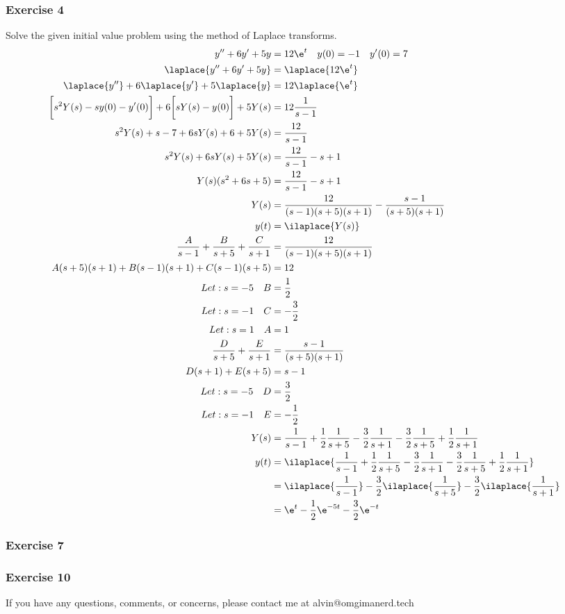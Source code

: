\documentclass{math}
\begin{document}
\subsubsection*{Exercise 4}
Solve the given initial value problem using the method of Laplace transforms.
\begin{align*}
  y''+6y'+5y &= 12\e^t \quad y(0) = -1 \quad y'(0) = 7 \\
  \laplace{y''+6y'+5y} &= \laplace{12\e^t} \\
  \laplace{y''}+6\laplace{y'}+5\laplace{y} &= 12\laplace{\e^t} \\
  \bigg[s^2Y(s)-sy(0)-y'(0)\bigg]+6\bigg[sY(s)-y(0)\bigg]+5Y(s) &=
    12\frac{1}{s-1} \\
  s^2Y(s)+s-7+6sY(s)+6+5Y(s) &= \frac{12}{s-1} \\
  s^2Y(s)+6sY(s)+5Y(s) &= \frac{12}{s-1}-s+1 \\
  Y(s)(s^2+6s+5) &= \frac{12}{s-1}-s+1 \\
  Y(s) &= \frac{12}{(s-1)(s+5)(s+1)}-\frac{s-1}{(s+5)(s+1)} \\
  y(t) &= \ilaplace{Y(s)} \\
  \frac{A}{s-1}+\frac{B}{s+5}+\frac{C}{s+1} &= \frac{12}{(s-1)(s+5)(s+1)} \\
  A(s+5)(s+1)+B(s-1)(s+1)+C(s-1)(s+5) &= 12 \\
  Let: s = -5 \quad B &= \frac{1}{2} \\
  Let: s = -1 \quad C &= -\frac{3}{2} \\
  Let: s = 1 \quad A &= 1 \\
  \frac{D}{s+5}+\frac{E}{s+1} &= \frac{s-1}{(s+5)(s+1)} \\
  D(s+1)+E(s+5) &= s-1 \\
  Let: s = -5 \quad D &= \frac{3}{2} \\
  Let: s = -1 \quad E &= -\frac{1}{2} \\
  Y(s) &= \frac{1}{s-1}+\frac{1}{2}\frac{1}{s+5}-\frac{3}{2}\frac{1}{s+1}
    -\frac{3}{2}\frac{1}{s+5}+\frac{1}{2}\frac{1}{s+1} \\
  y(t) &= \ilaplace{\frac{1}{s-1}+\frac{1}{2}\frac{1}{s+5}-
    \frac{3}{2}\frac{1}{s+1}-\frac{3}{2}\frac{1}{s+5}+
    \frac{1}{2}\frac{1}{s+1}} \\
  &= \ilaplace{\frac{1}{s-1}}-\frac{3}{2}\ilaplace{\frac{1}{s+5}}-
    \frac{3}{2}\ilaplace{\frac{1}{s+1}} \\
  &= \e^{t}-\frac{1}{2}\e^{-5t}-\frac{3}{2}\e^{-t}
\end{align*}

\subsubsection*{Exercise 7}
\subsubsection*{Exercise 10}

\begin{center}
  If you have any questions, comments, or concerns, please contact me at
  alvin@omgimanerd.tech
\end{center}
\end{document}
